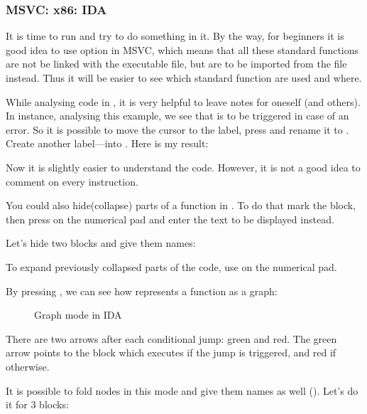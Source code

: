 \subsubsection{MSVC: x86: IDA}

It is time to run \IDA and try to do something in it.
By the way, for beginners it is good idea to use  option in MSVC, which means that all these
standard functions are not be linked with the executable file, 
but are to be imported from the  file instead.
Thus it will be easier to see which standard function are used and where.

While analysing code in \IDA, it is very helpful to leave notes for oneself (and others).
In instance, analysing this example, 
we see that  is to be triggered in case of an error.
So it is possible to move the cursor to the label, press  and rename it to .
Create another label---into .
Here is my result:



Now it is slightly easier to understand the code.
However, it is not a good idea to comment on every instruction.

You could also hide(collapse) parts of a function in \IDA.
To do that mark the block, then press \q{--} on the numerical pad and enter the text to be displayed instead.

Let's hide two blocks and give them names:



To expand previously collapsed parts of the code, use \q{+} on the numerical pad.

\clearpage
By pressing , we can see how \IDA represents a function as a graph:

\begin{figure}[H]
\centering
{}
\caption{Graph mode in IDA}
\label{fig:ex3_IDA_1}
\end{figure}

There are two arrows after each conditional jump: green and red.
The green arrow points to the block which executes if the jump is triggered, and red if otherwise.

\clearpage
It is possible to fold nodes in this mode and give them names as well ().
Let's do it for 3 blocks:

